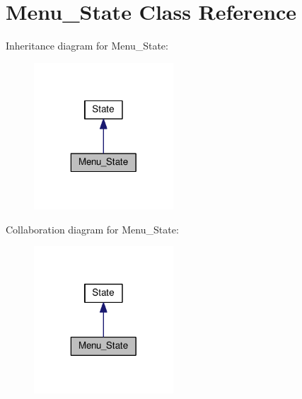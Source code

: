 \hypertarget{classMenu__State}{\section{Menu\+\_\+\+State Class Reference}
\label{classMenu__State}
}


Inheritance diagram for Menu\+\_\+\+State\+:\nopagebreak
\begin{figure}[H]
\begin{center}
\leavevmode
\includegraphics[width=148pt]{classMenu__State__inherit__graph}
\end{center}
\end{figure}


Collaboration diagram for Menu\+\_\+\+State\+:\nopagebreak
\begin{figure}[H]
\begin{center}
\leavevmode
\includegraphics[width=148pt]{classMenu__State__coll__graph}
\end{center}
\end{figure}

